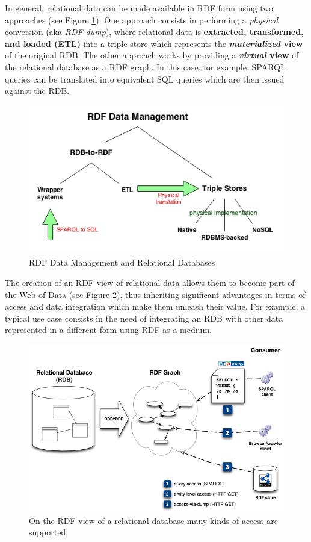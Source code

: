 \documentclass[11pt]{llncs}
\begin{document}
In general, relational data can be made available in RDF form using two approaches (see Figure \ref{fig:rdfmanagement}).
One approach consists in performing a \emph{physical} conversion (aka \emph{RDF dump}), where 
 relational data is \textbf{extracted, transformed, and loaded (ETL)} into a triple store which represents the 
 \textbf{\emph{materialized} view} of the original RDB.
The other approach works by providing a \textbf{\emph{virtual} view} of the relational database as a RDF graph. 
 In this case, for example, SPARQL queries can be translated into equivalent SQL queries which are then issued against the RDB.

 \begin{figure}[H]
 \centering
 \includegraphics[scale = 0.6]{img/rdfmanagement.png}
  \caption{RDF Data Management and Relational Databases \cite{rdb2rdf_vimeo_euclid}}
 \label{fig:rdfmanagement}
\end{figure}  

The creation of an RDF view of relational data allows them to become part of the Web of Data (see Figure \ref{fig:rdb2rdf_principle}),
 thus inheriting significant advantages in terms of access and data integration which make them unleash their value.
 For example, a typical use case consists in the need of integrating an RDB 
 with other data represented in a different form using RDF as a medium.

 \begin{figure}[H]
 \centering
 \includegraphics[scale = 1.6]{img/rdb2rdf_principle.png}
  \caption{On the RDF view of a relational database many kinds of access are supported. \cite{W3UCMapping}}
 \label{fig:rdb2rdf_principle}
\end{figure}
\end{document}
